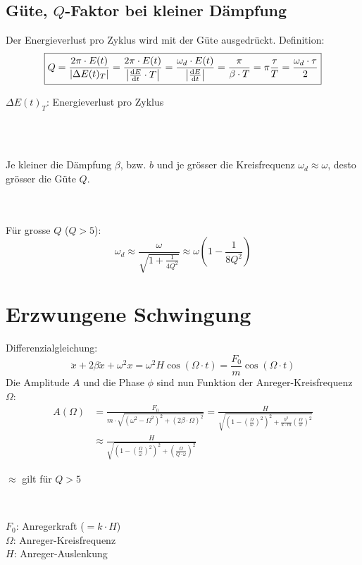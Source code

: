 \subsection{Güte, $Q$-Faktor bei kleiner Dämpfung}
Der Energieverlust pro Zyklus wird mit der Güte ausgedrückt. Definition:
\[\boxed{
	Q = \frac{2\pi \cdot E(t)}{\left| \Delta E(t)_T \right|}
	  = \frac{2\pi \cdot E(t)}{\left| \frac{\mathrm{d} E}{\mathrm{d} t} \cdot T \right|}
	  = \frac{\omega_d \cdot E(t)}{\left| \frac{\mathrm{d} E}{\mathrm{d} t} \right|}
	  = \frac{\pi}{\beta \cdot T}
	  = \pi\frac{\tau}{T}
	  = \frac{\omega_d \cdot \tau}{2}
}\]
\begin{footnotesize}
	$\Delta E(t)_T$: Energieverlust pro Zyklus
\end{footnotesize}
\\\\
\begin{footnotesize}
	Je kleiner die Dämpfung $\beta$, bzw. $b$ und je grösser die Kreisfrequenz $\omega_d \approx \omega$, desto grösser die Güte $Q$.
\end{footnotesize}
\\\\
Für grosse $Q$ ($Q>5$):
\[\boxed{
	\omega_d \approx \frac{\omega}{\sqrt{1 + \frac{1}{4Q^2}}} \approx \omega \left( 1 - \frac{1}{8Q^2} \right)
}\]


\section{Erzwungene Schwingung}
Differenzialgleichung:
\[
	\ddot{x} + 2\beta \dot{x} + \omega^2x = \omega^2 H \cos(\Omega \cdot t) = \frac{F_0}{m} \cos(\Omega \cdot t)
\]
Die Amplitude $A$ und die Phase $\phi$ sind nun Funktion der Anreger-Kreisfrequenz $\Omega$:
\[\boxed{\begin{aligned}
	A(\Omega) &= \frac{F_0}{m \cdot \sqrt{\left(\omega^2 -        \Omega^2\right)^2 + \left(2\beta \cdot \Omega\right)^2}}
	          = \frac{H}{\sqrt{\left(1- \left(\frac{\Omega}{\omega}\right)^2\right)^2+\frac{b^2}{k\cdot m} \left( \frac{\Omega}{\omega} \right)^2}}\\
	&\approx \frac{H}{\sqrt{\left(1- \left(\frac{\Omega}{\omega}\right)^2\right)^2+\left( \frac{\Omega}{Q\cdot\omega} \right)^2}}
\end{aligned}}\]
\begin{footnotesize}
	$\approx$ gilt für $Q>5$
\end{footnotesize}
\\
\begin{footnotesize}
	$F_0$: Anregerkraft ($=k \cdot H$)\\
	$\Omega$: Anreger-Kreisfrequenz\\
	$H$: Anreger-Auslenkung
\end{footnotesize}


